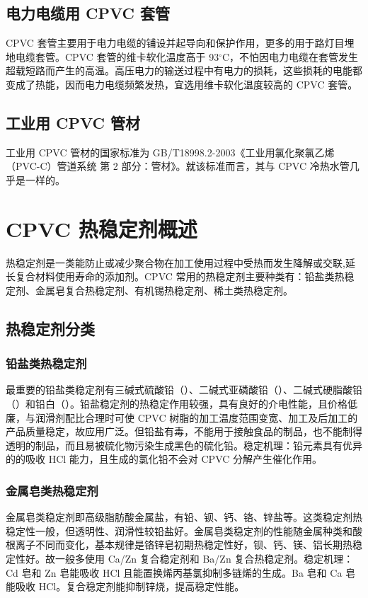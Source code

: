 \documentclass[a4paper, oneside, onecolumn, 12pt]{ctexrep}    %
\newcommand{\cd}{$^{\circ}$C}  %
\begin{document}
\subsection{电力电缆用 CPVC 套管}
CPVC 套管主要用于电力电缆的铺设并起导向和保护作用，更多的用于路灯目埋地电缆套管。CPVC 套管的维卡软化温度高于 93\cd，不怕因电力电缆在套管发生超载短路而产生的高温。高压电力的输送过程中有电力的损耗，这些损耗的电能都变成了热能，因而电力电缆频繁发热，宜选用维卡软化温度较高的 CPVC 套管。

\subsection{工业用 CPVC 管材}
工业用 CPVC 管材的国家标准为 GB/T18998.2-2003《工业用氯化聚氯乙烯（PVC-C）管道系统 第 2 部分：管材》。就该标准而言，其与 CPVC 冷热水管几乎是一样的。


\section{CPVC 热稳定剂概述}

热稳定剂是一类能防止或减少聚合物在加工使用过程中受热而发生降解或交联,延长复合材料使用寿命的添加剂。CPVC 常用的热稳定剂主要种类有：铅盐类热稳定剂、金属皂复合热稳定剂、有机锡热稳定剂、稀土类热稳定剂。

\subsection{热稳定剂分类}

\subsubsection{铅盐类热稳定剂}
最重要的铅盐类稳定剂有三碱式硫酸铅（）、二碱式亚磷酸铅（）、二碱式硬脂酸铅（）和铅白（）。铅盐稳定剂的热稳定作用较强，具有良好的介电性能，且价格低廉，与润滑剂配比合理时可使 CPVC 树脂的加工温度范围变宽、加工及后加工的产品质量稳定，故应用广泛。但铅盐有毒，不能用于接触食品的制品，也不能制得透明的制品，而且易被硫化物污染生成黑色的硫化铅。稳定机理：铅元素具有优异的的吸收 HCl 能力，且生成的氯化铅不会对 CPVC 分解产生催化作用。

\subsubsection{金属皂类热稳定剂}
金属皂类稳定剂即高级脂肪酸金属盐，有铅、钡、钙、铬、锌盐等。这类稳定剂热稳定性一般，但透明性、润滑性较铅盐好。金属皂类稳定剂的性能随金属种类和酸根离子不同而变化，基本规律是铬锌皂初期热稳定性好，钡、钙、镁、铝长期热稳定性好。故一般多使用 Ca/Zn 复合稳定剂和 Ba/Zn 复合热稳定剂。稳定机理：Cd 皂和 Zn 皂能吸收 HCl 且能置换烯丙基氯抑制多链烯的生成。Ba 皂和 Ca 皂能吸收 HCl。复合稳定剂能抑制锌烧，提高稳定性能。
\end{document}

